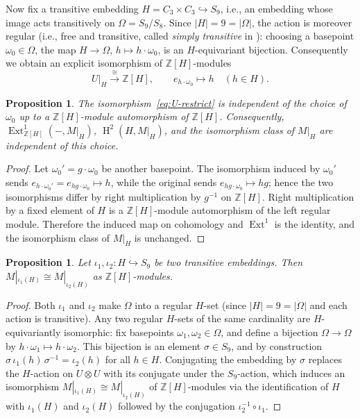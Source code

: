 \documentclass[12pt,a4paper]{article}
\newtheorem{proposition}[theorem]{Proposition}
\theoremstyle{definition}
\DeclareMathOperator{\Ext}{Ext}
\DeclareMathOperator{\coh}{H}
\begin{document}
Now fix a transitive embedding \(H = C_3 \times C_3 \hookrightarrow S_9\),
i.e., an embedding whose image acts transitively on
\(\Omega = S_9/S_8\).
Since \(|H| = 9 = |\Omega|\), the action is moreover regular
(i.e., free and transitive, called \emph{simply transitive}
in \cite[ch.I, \S5, no.6, def.7]{Bourbaki2007a}):
choosing a basepoint \(\omega_0 \in \Omega\), the map
\(H \to \Omega\), \(h \mapsto h \cdot \omega_0\), is an \(H\)-equivariant
bijection. Consequently we obtain an explicit isomorphism of
\(\mathbb{Z}[H]\)-modules
\begin{equation}\label{eq:U-restrict}
U|_H \xrightarrow{\ \cong\ } \mathbb{Z}[H], \qquad
e_{h \cdot \omega_0} \longmapsto h \quad (h \in H).
\end{equation}

\begin{proposition}\label{prop:U-restrict-canonical}
The isomorphism~\eqref{eq:U-restrict} is independent of the choice of
\(\omega_0\) up to a \(\mathbb{Z}[H]\)-module automorphism of
\(\mathbb{Z}[H]\).  Consequently,
\(\Ext^1_{\mathbb{Z}[H]}(-, M|_H)\), \(\coh^2(H, M|_H)\), and the
isomorphism class of \(M|_H\) are independent of this choice.
\end{proposition}

\begin{proof}
Let \(\omega_0' = g \cdot \omega_0\) be another basepoint.
The isomorphism induced by \(\omega_0'\) sends
\(e_{h \cdot \omega_0'} = e_{hg \cdot \omega_0} \longmapsto h\),
while the original sends \(e_{hg \cdot \omega_0} \longmapsto hg\);
hence the two isomorphisms differ by right multiplication by
\(g^{-1}\) on \(\mathbb{Z}[H]\).  Right multiplication by a fixed
element of \(H\) is a \(\mathbb{Z}[H]\)-module automorphism of the
left regular module.  Therefore the induced map on cohomology and
\(\Ext^1\) is the identity, and the isomorphism class of \(M|_H\) is unchanged.
\end{proof}

\begin{proposition}\label{prop:embedding-independence}
Let \(\iota_1, \iota_2 : H \hookrightarrow S_9\) be two transitive embeddings.
Then \(M|_{\iota_1(H)} \cong M|_{\iota_2(H)}\) as \(\mathbb{Z}[H]\)-modules.
\end{proposition}

\begin{proof}
Both \(\iota_1\) and \(\iota_2\) make \(\Omega\) into a regular
\(H\)-set (since \(|H| = 9 = |\Omega|\) and each action is transitive).
Any two regular \(H\)-sets of the same cardinality are
\(H\)-equivariantly isomorphic: fix basepoints
\(\omega_1, \omega_2 \in \Omega\), and define a bijection
\(\Omega \to \Omega\) by \(h \cdot \omega_1 \longmapsto h \cdot \omega_2\).
This bijection is an element \(\sigma \in S_9\), and by construction
\(\sigma \, \iota_1(h) \, \sigma^{-1} = \iota_2(h)\) for all \(h \in H\).
Conjugating the embedding by \(\sigma\) replaces the
\(H\)-action on \(U \otimes U\) with its conjugate under the \(S_9\)-action,
which induces an isomorphism \(M|_{\iota_1(H)} \cong M|_{\iota_2(H)}\) of
\(\mathbb{Z}[H]\)-modules via the identification of \(H\) with
\(\iota_1(H)\) and \(\iota_2(H)\) followed by the conjugation
\(\iota_2^{-1} \circ \iota_1\).
\end{proof}
\end{document}
